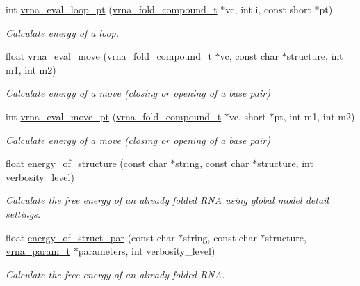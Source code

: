 \begin{DoxyCompactItemize}
int \hyperlink{group__eval_ga730ba4df55c02fd530a0cddd49faf760}{vrna\-\_\-eval\-\_\-loop\-\_\-pt} (\hyperlink{group__fold__compound_ga1b0cef17fd40466cef5968eaeeff6166}{vrna\-\_\-fold\-\_\-compound\-\_\-t} $\ast$vc, int i, const short $\ast$pt)
\begin{DoxyCompactList}\small\item\em Calculate energy of a loop. \end{DoxyCompactList}\item 
float \hyperlink{group__eval_gaff1b9e4f4d17b434b0a822fe783672c1}{vrna\-\_\-eval\-\_\-move} (\hyperlink{group__fold__compound_ga1b0cef17fd40466cef5968eaeeff6166}{vrna\-\_\-fold\-\_\-compound\-\_\-t} $\ast$vc, const char $\ast$structure, int m1, int m2)
\begin{DoxyCompactList}\small\item\em Calculate energy of a move (closing or opening of a base pair) \end{DoxyCompactList}\item 
int \hyperlink{group__eval_ga123dabc119ea98c968a5e903cc46f0fb}{vrna\-\_\-eval\-\_\-move\-\_\-pt} (\hyperlink{group__fold__compound_ga1b0cef17fd40466cef5968eaeeff6166}{vrna\-\_\-fold\-\_\-compound\-\_\-t} $\ast$vc, short $\ast$pt, int m1, int m2)
\begin{DoxyCompactList}\small\item\em Calculate energy of a move (closing or opening of a base pair) \end{DoxyCompactList}\item 
float \hyperlink{group__eval_gaf93986cb3cb29770ec9cca69c9fab8cf}{energy\-\_\-of\-\_\-structure} (const char $\ast$string, const char $\ast$structure, int verbosity\-\_\-level)
\begin{DoxyCompactList}\small\item\em Calculate the free energy of an already folded R\-N\-A using global model detail settings. \end{DoxyCompactList}\item 
float \hyperlink{group__eval_gaf9d064d3c496de42eca6734a96fd2090}{energy\-\_\-of\-\_\-struct\-\_\-par} (const char $\ast$string, const char $\ast$structure, \hyperlink{group__energy__parameters_ga8a69ca7d787e4fd6079914f5343a1f35}{vrna\-\_\-param\-\_\-t} $\ast$parameters, int verbosity\-\_\-level)
\begin{DoxyCompactList}\small\item\em Calculate the free energy of an already folded R\-N\-A. \end{DoxyCompactList}\item 

\end{DoxyCompactItemize}
